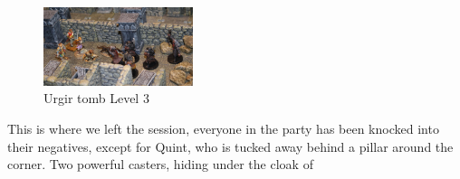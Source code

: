 \begin{figure}[h]
	\centering
	\includegraphics[width=0.39\textwidth]{images/Urgir-tomb-Level-3-594713616.jpg}
	\caption{Urgir tomb Level 3}
	\label{fig:Urgir-tomb-Level-3-594713616}
\end{figure}

This is where we left the session, everyone in the party has been knocked into their negatives, except for Quint, who is tucked away behind a pillar around the corner. Two powerful casters, hiding under the cloak of 